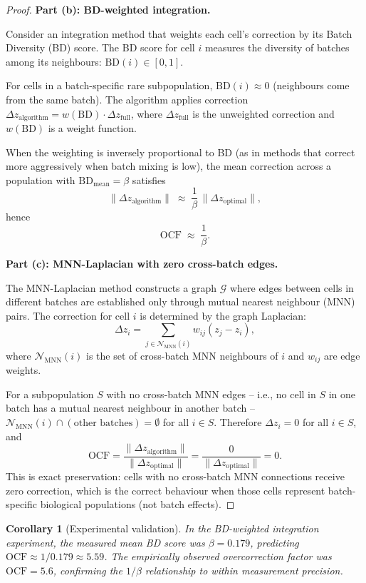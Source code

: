 \documentclass[11pt]{article}
\newtheorem{corollary}[theorem]{Corollary}
\begin{document}
\begin{proof}
\medskip
\textbf{Part (b): BD-weighted integration.}

Consider an integration method that weights each cell's correction by its
Batch Diversity (BD) score.  The BD score for cell $i$ measures the
diversity of batches among its neighbours:
$\mathrm{BD}(i) \in [0, 1]$.

For cells in a batch-specific rare subpopulation, $\mathrm{BD}(i) \approx 0$
(neighbours come from the same batch).  The algorithm applies correction
$\Delta z_{\mathrm{algorithm}} = w(\mathrm{BD})\cdot\Delta z_{\mathrm{full}}$,
where $\Delta z_{\mathrm{full}}$ is the unweighted correction and
$w(\mathrm{BD})$ is a weight function.

When the weighting is inversely proportional to BD (as in methods that
correct more aggressively when batch mixing is low), the mean correction
across a population with $\mathrm{BD}_{\mathrm{mean}} = \beta$ satisfies
\[
    \|\Delta z_{\mathrm{algorithm}}\|
    \;\approx\; \frac{1}{\beta}\,\|\Delta z_{\mathrm{optimal}}\|,
\]
hence
\[
    \mathrm{OCF} \;\approx\; \frac{1}{\beta}.
\]

\medskip
\textbf{Part (c): MNN-Laplacian with zero cross-batch edges.}

The MNN-Laplacian method constructs a graph $\mathcal{G}$ where edges
between cells in different batches are established only through mutual
nearest neighbour (MNN) pairs.  The correction for cell $i$ is determined
by the graph Laplacian:
\[
    \Delta z_i = \sum_{j \in \mathcal{N}_{\mathrm{MNN}}(i)}
    w_{ij}(z_j - z_i),
\]
where $\mathcal{N}_{\mathrm{MNN}}(i)$ is the set of cross-batch MNN
neighbours of $i$ and $w_{ij}$ are edge weights.

For a subpopulation $S$ with no cross-batch MNN edges -- i.e., no cell in
$S$ in one batch has a mutual nearest neighbour in another batch --
$\mathcal{N}_{\mathrm{MNN}}(i) \cap (\text{other batches}) = \emptyset$
for all $i \in S$.  Therefore $\Delta z_i = 0$ for all $i \in S$, and
\[
    \mathrm{OCF} = \frac{\|\Delta z_{\mathrm{algorithm}}\|}
                        {\|\Delta z_{\mathrm{optimal}}\|}
    = \frac{0}{\|\Delta z_{\mathrm{optimal}}\|} = 0.
\]
This is exact preservation: cells with no cross-batch MNN connections
receive zero correction, which is the correct behaviour when those cells
represent batch-specific biological populations (not batch effects).
\end{proof}

\begin{corollary}[Experimental validation]
\label{cor:ocf-validation}
In the BD-weighted integration experiment, the measured mean BD score was
$\beta = 0.179$, predicting $\mathrm{OCF} \approx 1/0.179 \approx 5.59$.
The empirically observed overcorrection factor was $\mathrm{OCF} = 5.6$,
confirming the $1/\beta$ relationship to within measurement precision.
\end{corollary}
\end{document}
